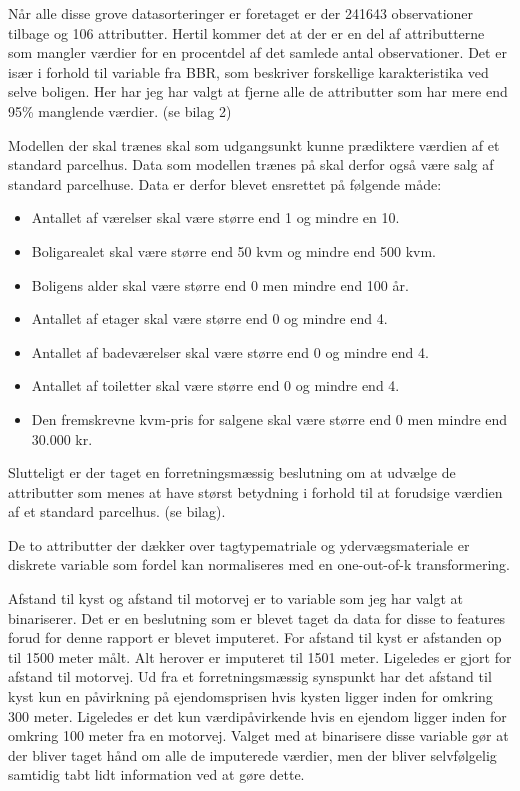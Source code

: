 \documentclass{report}
\begin{document}
Når alle disse grove datasorteringer er foretaget er der 241643 observationer tilbage og 106
attributter.
Hertil kommer det at der er en del af attributterne som mangler værdier for en procentdel af det
samlede antal observationer. Det er især i forhold til variable fra BBR, som beskriver forskellige
karakteristika ved selve boligen. Her har jeg har valgt at fjerne alle de attributter som har mere
end 95\% manglende værdier. (se bilag 2)

Modellen der skal trænes skal som udgangsunkt kunne prædiktere værdien af et standard parcelhus.
Data som modellen trænes på skal derfor også være salg af standard parcelhuse.
Data er derfor blevet ensrettet på følgende måde:

\begin{itemize}
  \item Antallet af værelser skal være større end 1 og mindre en 10.
  \item Boligarealet skal være større end 50 kvm og mindre end 500 kvm.
  \item Boligens alder skal være større end 0 men mindre end 100 år.
  \item Antallet af etager skal være større end 0 og mindre end 4.
  \item Antallet af badeværelser skal være større end 0 og mindre end 4.
  \item Antallet af toiletter skal være større end 0 og mindre end 4.
  \item Den fremskrevne kvm-pris for salgene skal være større end 0 men mindre end 30.000 kr. 
\end{itemize}

Slutteligt er der taget en forretningsmæssig beslutning om at udvælge de attributter som menes at
have størst betydning i forhold til at forudsige værdien af et standard parcelhus.
(se bilag).

De to attributter der dækker over tagtypematriale og ydervægsmateriale er diskrete variable som
fordel kan normaliseres med en one-out-of-k transformering.

Afstand til kyst og afstand til motorvej er to variable som jeg har valgt at binariserer. Det er en
beslutning som er blevet taget da data for disse to features forud for denne rapport er blevet
imputeret. For afstand til kyst er afstanden op til 1500 meter målt. Alt herover er imputeret til
1501 meter. Ligeledes er gjort for afstand til motorvej. Ud fra et forretningsmæssig synspunkt har
det afstand til kyst kun en påvirkning på ejendomsprisen hvis kysten ligger inden for omkring 300
meter. Ligeledes er det kun værdipåvirkende hvis en ejendom ligger inden for omkring 100 meter fra
en motorvej. Valget med at binarisere disse variable gør at der bliver taget hånd om alle de
imputerede værdier, men der bliver selvfølgelig samtidig tabt lidt information ved at gøre dette.
\end{document}
